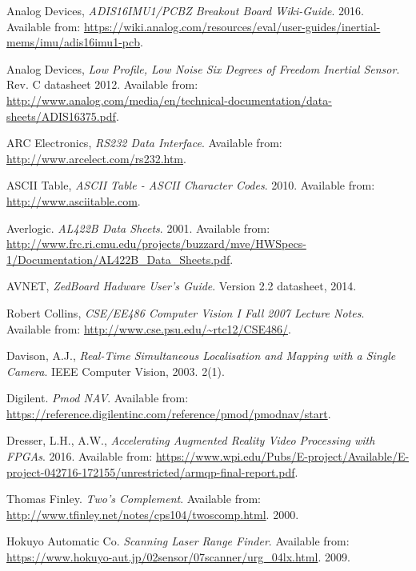 \begin{thebibliography}{9}

Analog Devices, \textit{ADIS16IMU1/PCBZ Breakout Board Wiki-Guide}. 2016. Available from: \url{https://wiki.analog.com/resources/eval/user-guides/inertial-mems/imu/adis16imu1-pcb}.

Analog Devices, \textit{Low Profile, Low Noise Six Degrees of Freedom Inertial Sensor}. Rev. C datasheet 2012. Available from: \url{http://www.analog.com/media/en/technical-documentation/data-sheets/ADIS16375.pdf}.

ARC Electronics, \textit{RS232 Data Interface}. Available from: \url{http://www.arcelect.com/rs232.htm}.

ASCII Table, \textit{ASCII Table - ASCII Character Codes}. 2010. Available from: \url{http://www.asciitable.com}.

Averlogic.
\textit{AL422B Data Sheets}. 2001.
Available from: \url{http://www.frc.ri.cmu.edu/projects/buzzard/mve/HWSpecs-1/Documentation/AL422B_Data_Sheets.pdf}.

AVNET, \textit{ZedBoard Hadware User's Guide}. Version 2.2 datasheet, 2014.

Robert Collins, \textit{CSE/EE486 Computer Vision I Fall 2007 Lecture Notes}. Available from: \url{http://www.cse.psu.edu/~rtc12/CSE486/}.

Davison, A.J.,
\textit{Real-Time Simultaneous Localisation and Mapping with a Single Camera}. 
IEEE Computer Vision, 2003. 2(1).

Digilent. \textit{Pmod NAV}. Available from: \url{https://reference.digilentinc.com/reference/pmod/pmodnav/start}.

Dresser, L.H., A.W., \textit{Accelerating Augmented Reality Video Processing with FPGAs}. 2016. Available from: \url{https://www.wpi.edu/Pubs/E-project/Available/E-project-042716-172155/unrestricted/armqp-final-report.pdf}.

Thomas Finley. \textit{Two's Complement}. Available from: \url{http://www.tfinley.net/notes/cps104/twoscomp.html}. 2000.

Hokuyo Automatic Co. \textit{Scanning Laser Range Finder}. Available from: \url{https://www.hokuyo-aut.jp/02sensor/07scanner/urg_04lx.html}. 2009.


\end{thebibliography}
